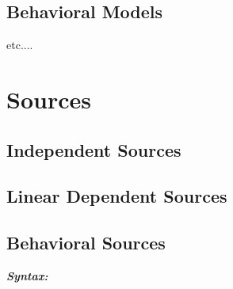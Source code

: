 \newpage
\subsection{Behavioral Models}
\label{subsec_sceadm_behavioralmodels}

{\Large etc....}

\section{Sources}
\label{sec_sceadm_sources}

\subsection{Independent Sources}
\label{subsec_sceadm_independentsources}

\subsection{Linear Dependent Sources}
\label{subsec_sceadm_lineardependentsources}

\subsection{Behavioral Sources}
\label{subsec_sceadm_behavioralsources}

\textbf{\textit{Syntax:}}

%

